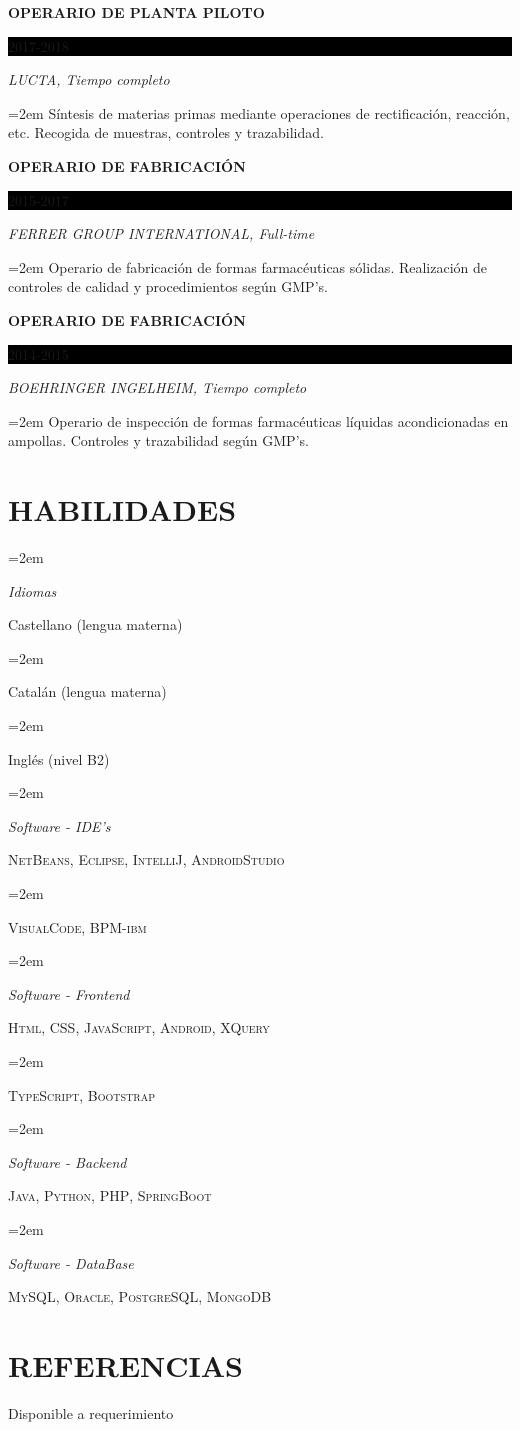 \documentclass[paper=a4,fontsize=11pt]{scrartcl} %
\newlength{\spacebox}
\newcommand{\sepspace}{\vspace*{1em}}		%
\newcommand{\NewPart}[1]{\section*{\uppercase{#1}}}
\newcommand{\PersonalEntry}[2]{
		\noindent\hangindent=2em\hangafter=0 %
		\parbox{\spacebox}{        %
		\textit{#1}}		       %
		\hspace{1.5em} #2 \par}    %
\newcommand{\SkillsEntry}[2]{      %
		\noindent\hangindent=2em\hangafter=0 %
		\parbox{\spacebox}{        %
		\textit{#1}}			   %
		\hspace{1.5em} #2 \par}    %
\newcommand{\EducationEntry}[4]{
		\noindent \textbf{#1} \hfill      %
		\colorbox{Black}{%
			\parbox{6em}{%
			\hfill\color{White}#2}} \par  %
		\noindent \textit{#3} \par        %
		\noindent\hangindent=2em\hangafter=0 \small #4 %
		\normalsize \par}
\begin{document}
\EducationEntry{OPERARIO DE PLANTA PILOTO}{2017-2018}{LUCTA, Tiempo completo}{Síntesis de materias primas mediante operaciones de rectificación, reacción, etc. Recogida de muestras, controles y trazabilidad.}
\sepspace

\newpage
\EducationEntry{OPERARIO DE FABRICACIÓN}{2015-2017}{FERRER GROUP INTERNATIONAL, Full-time}{Operario de fabricación de formas farmacéuticas sólidas. Realización de controles de calidad y procedimientos según GMP’s.}
\sepspace

\EducationEntry{OPERARIO DE FABRICACIÓN}{2014-2015}{BOEHRINGER INGELHEIM, Tiempo completo}{Operario de inspección de formas farmacéuticas líquidas acondicionadas en ampollas. Controles y trazabilidad según GMP’s.}
\sepspace

\NewPart{Habilidades}{}

\SkillsEntry{Idiomas}{Castellano (lengua materna)}
\SkillsEntry{}{Catalán (lengua materna)}
\SkillsEntry{}{Inglés (nivel B2)}
\sepspace

\SkillsEntry{Software - IDE's}{\textsc{NetBeans}, \textsc{Eclipse}, \textsc{IntelliJ}, \textsc{AndroidStudio}}
\SkillsEntry{}{\textsc{VisualCode}, \textsc{BPM-ibm}}
\sepspace

\SkillsEntry{Software - Frontend}{\textsc{Html}, \textsc{CSS}, \textsc{JavaScript}, \textsc{Android}, \textsc{XQuery}}
\SkillsEntry{}{\textsc{TypeScript}, \textsc{Bootstrap}}
\sepspace

\SkillsEntry{Software - Backend}{\textsc{Java}, \textsc{Python}, \textsc{PHP}, \textsc{SpringBoot}}
\sepspace

\SkillsEntry{Software - DataBase}{\textsc{MySQL, Oracle, PostgreSQL, MongoDB}}
\sepspace


\NewPart{Referencias}{}
Disponible a requerimiento
\end{document}

